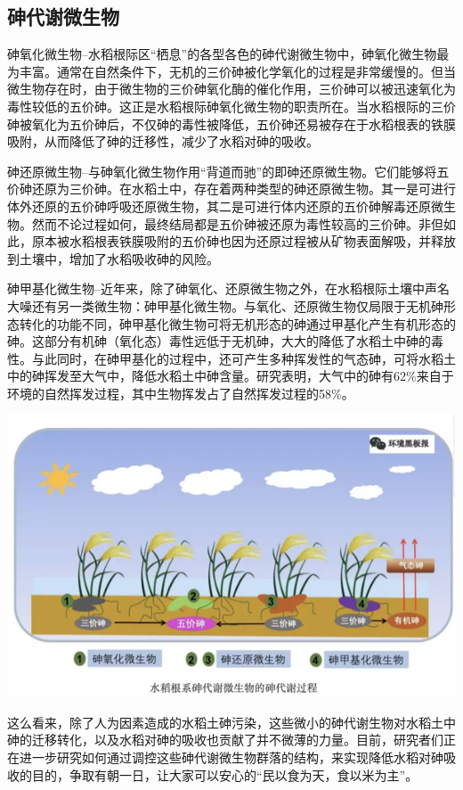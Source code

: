 \documentclass[]{book}
\begin{document}
\subsection{砷代谢微生物}

砷氧化微生物--水稻根际区``栖息''的各型各色的砷代谢微生物中，砷氧化微生物最为丰富。通常在自然条件下，无机的三价砷被化学氧化的过程是非常缓慢的。但当微生物存在时，由于微生物的三价砷氧化酶的催化作用，三价砷可以被迅速氧化为毒性较低的五价砷。这正是水稻根际砷氧化微生物的职责所在。当水稻根际的三价砷被氧化为五价砷后，不仅砷的毒性被降低，五价砷还易被存在于水稻根表的铁膜吸附，从而降低了砷的迁移性，减少了水稻对砷的吸收。

砷还原微生物--与砷氧化微生物作用``背道而驰''的即砷还原微生物。它们能够将五价砷还原为三价砷。在水稻土中，存在着两种类型的砷还原微生物。其一是可进行体外还原的五价砷呼吸还原微生物，其二是可进行体内还原的五价砷解毒还原微生物。然而不论过程如何，最终结局都是五价砷被还原为毒性较高的三价砷。非但如此，原本被水稻根表铁膜吸附的五价砷也因为还原过程被从矿物表面解吸，并释放到土壤中，增加了水稻吸收砷的风险。

砷甲基化微生物--近年来，除了砷氧化、还原微生物之外，在水稻根际土壤中声名大噪还有另一类微生物：砷甲基化微生物。与氧化、还原微生物仅局限于无机砷形态转化的功能不同，砷甲基化微生物可将无机形态的砷通过甲基化产生有机形态的砷。这部分有机砷（氧化态）毒性远低于无机砷，大大的降低了水稻土中砷的毒性。与此同时，在砷甲基化的过程中，还可产生多种挥发性的气态砷，可将水稻土中的砷挥发至大气中，降低水稻土中砷含量。研究表明，大气中的砷有62\%来自于环境的自然挥发过程，其中生物挥发占了自然挥发过程的58\%。

\includegraphics[width=8.33in]{images/as4}

这么看来，除了人为因素造成的水稻土砷污染，这些微小的砷代谢生物对水稻土中砷的迁移转化，以及水稻对砷的吸收也贡献了并不微薄的力量。目前，研究者们正在进一步研究如何通过调控这些砷代谢微生物群落的结构，来实现降低水稻对砷吸收的目的，争取有朝一日，让大家可以安心的``民以食为天，食以米为主''。
\end{document}
